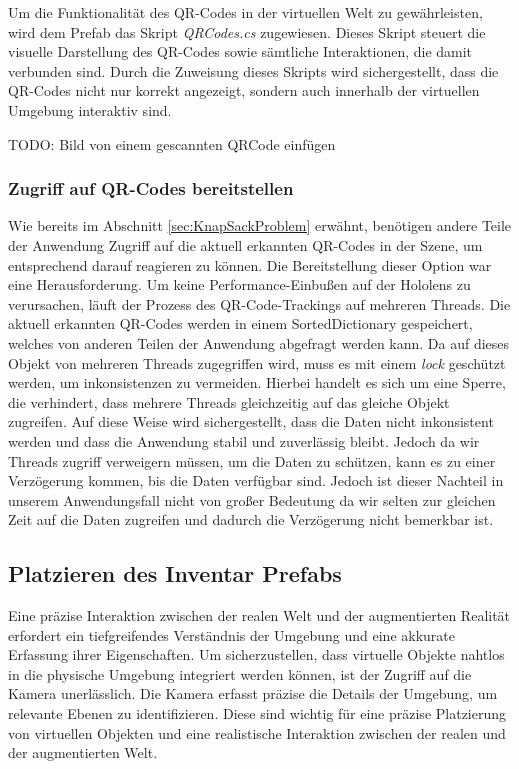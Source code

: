 Um die Funktionalität des QR-Codes in der virtuellen Welt zu gewährleisten, wird dem Prefab das Skript \textit{QRCodes.cs} zugewiesen.
Dieses Skript steuert die visuelle Darstellung des QR-Codes sowie sämtliche Interaktionen, die damit verbunden sind. Durch
die Zuweisung dieses Skripts wird sichergestellt, dass die QR-Codes nicht nur korrekt angezeigt, sondern auch innerhalb
der virtuellen Umgebung interaktiv sind.

TODO: Bild von einem gescannten QRCode einfügen

\subsubsection{Zugriff auf QR-Codes bereitstellen}
Wie bereits im Abschnitt \ref{sec:KnapSackProblem} erwähnt, benötigen andere Teile der Anwendung Zugriff auf
die aktuell erkannten QR-Codes in der Szene, um entsprechend darauf reagieren zu können. Die Bereitstellung dieser Option war eine Herausforderung.
Um keine Performance-Einbußen auf der Hololens zu verursachen, läuft der Prozess des QR-Code-Trackings auf
mehreren Threads. Die aktuell erkannten QR-Codes werden in einem SortedDictionary gespeichert, welches von anderen Teilen
der Anwendung abgefragt werden kann. Da auf dieses Objekt von mehreren Threads zugegriffen wird, muss es mit einem
\textit{lock} geschützt werden, um inkonsistenzen zu vermeiden. Hierbei handelt es sich um eine Sperre, die verhindert,
dass mehrere Threads gleichzeitig auf das gleiche Objekt zugreifen. Auf diese Weise wird sichergestellt, dass die Daten
nicht inkonsistent werden und dass die Anwendung stabil und zuverlässig bleibt. Jedoch da wir Threads zugriff verweigern
müssen, um die Daten zu schützen, kann es zu einer Verzögerung kommen, bis die Daten verfügbar sind. Jedoch ist dieser
Nachteil in unserem Anwendungsfall nicht von großer Bedeutung da wir selten zur gleichen Zeit auf die Daten zugreifen und
dadurch die Verzögerung nicht bemerkbar ist.

\subsection{Platzieren des Inventar Prefabs}
Eine präzise Interaktion zwischen der realen Welt und der augmentierten Realität erfordert ein tiefgreifendes Verständnis
der Umgebung und eine akkurate Erfassung ihrer Eigenschaften. Um sicherzustellen, dass virtuelle Objekte nahtlos in die
physische Umgebung integriert werden können, ist der Zugriff auf die Kamera unerlässlich. Die Kamera erfasst präzise die
Details der Umgebung, um relevante Ebenen zu identifizieren. Diese sind wichtig für eine präzise Platzierung von virtuellen
Objekten und eine realistische Interaktion zwischen der realen und der augmentierten Welt.

